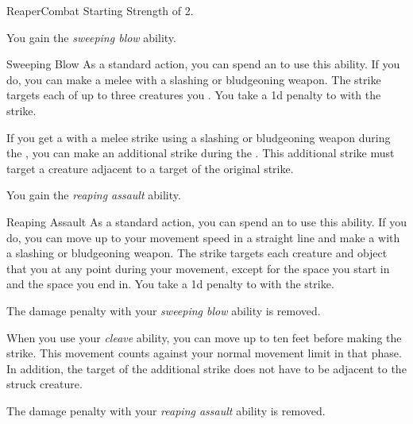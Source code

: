     \begin{feat}{Reaper}{Combat}
        \featpre Starting Strength of 2.

         You gain the \textit{sweeping blow} ability.
        \begin{ability}{Sweeping Blow}
            As a standard action, you can spend an  to use this ability.
            If you do, you can make a melee  with a slashing or bludgeoning weapon.
            The strike targets each of up to three creatures you .
            You take a \minus1d penalty to  with the strike.
        \end{ability}

         If you get a  with a melee strike using a slashing or bludgeoning weapon during the , you can make an additional strike during the .
        This additional strike must target a creature adjacent to a target of the original strike.

         You gain the \textit{reaping assault} ability.
        \begin{ability}{Reaping Assault}
            As a standard action, you can spend an  to use this ability.
            If you do, you can move up to your movement speed in a straight line and make a  with a slashing or bludgeoning weapon.
            The strike targets each creature and object that you  at any point during your movement, except for the space you start in and the space you end in.
            You take a \minus1d penalty to  with the strike.
        \end{ability}

         The damage penalty with your \textit{sweeping blow} ability is removed.

         When you use your \textit{cleave} ability, you can move up to ten feet before making the strike.
        This movement counts against your normal movement limit in that phase.
        In addition, the target of the additional strike does not have to be adjacent to the struck creature.

         The damage penalty with your \textit{reaping assault} ability is removed.


\end{feat}
